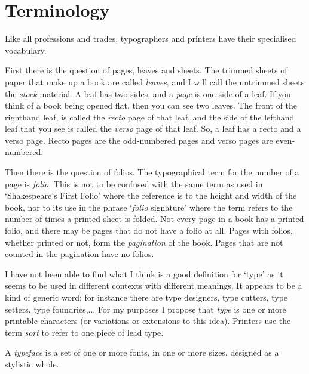 \documentclass[10pt,a4paper,extrafontsizes]{memoir}
\begin{document}
\chapter{Terminology}

\begin{paracol}{2}
\switchEng
    Like all professions and trades, typographers and printers have their
specialised vocabulary.

First there is the question of pages, leaves and sheets.  The trimmed
sheets of paper that make up a book are called
\emph{leaves}, and I will call the untrimmed sheets the
\emph{stock} material.  A leaf has two sides, and a
\emph{page} is one side of a leaf.  If you think of a book
being opened flat, then you can see two leaves. The front of the
righthand leaf, is called the \emph{recto} page of that
leaf, and the side of the lefthand leaf that you see is called the
\emph{verso} page of that leaf.  So, a leaf has a recto
and a verso page. Recto pages are the odd-numbered pages and verso
pages are even-numbered.

   Then there is the question of folios. The typographical term for
the number of a page is \emph{folio}.
This is not to be confused with
the same term as used in `Shakespeare's First Folio' where the reference is
to the height and width of the book, nor to its use in the phrase
`\emph{folio} signature' where the term refers to the 
number of times a printed sheet is folded. 
Not every page in a book has a printed
folio, and there may be pages that do not have a folio at all. Pages with
folios, whether printed or not, form the \emph{pagination} 
of the book. Pages
that are not counted in the pagination have no folios.

 I have not been able to find what I think is a good
definition for `type' as it seems to be used in different contexts with
different meanings. It appears to be a kind of generic word; for instance
there are type designers, type cutters, type setters, type foundries,...
For my purposes I propose that \emph{type} is 
one or more printable characters (or variations or extensions to this idea).  
Printers use the term \emph{sort} to refer to one piece of lead
type.

   A \emph{typeface} is a set of one or more fonts, in one
or more sizes, designed as a stylistic whole. 


\end{paracol}
\end{document}
